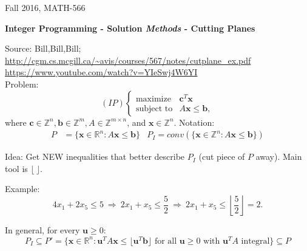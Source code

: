 \documentclass[11pt]{article}
\begin{document}
Fall  2016, MATH-566

\centerline{{\Large \textbf{Integer Programming - Solution \emph{Methods} - Cutting Planes}}}

Source: Bill,Bill,Bill; \\
\url{http://cgm.cs.mcgill.ca/~avis/courses/567/notes/cutplane_ex.pdf} \\
\url{https://www.youtube.com/watch?v=YIeSwj4W6YI}\\

Problem:
\[
(IP)
\begin{cases}
\text{maximize} & \mathbf{c}^T\mathbf{x} \\
\text{subject to} & A\mathbf{x} \leq \mathbf{b},
\end{cases}
\]
where $\mathbf{c} \in \mathbb{Z}^n, \mathbf{b} \in \mathbb{Z}^m, A \in \mathbb{Z}^{m \times n}$, and $\mathbf{x} \in \mathbb{Z}^n$.
Notation:
\begin{align*}
P &= \{ \mathbf{x}\in\mathbb{R}^n: A\mathbf{x} \leq \mathbf{b}  \}   &  
P_I = conv(\{\mathbf{x} \in \mathbb{Z}^n: A\mathbf{x} \leq \mathbf{b} \})
\end{align*}

Idea: Get NEW inequalities that better describe $P_I$ (cut piece of $P$ away). Main tool is $\lfloor\ \rfloor$.

Example:
\[
4x_1 + 2x_5 \leq 5 \ \Rightarrow\  2x_1 + x_5 \leq \frac{5}{2}\ \Rightarrow\  2x_1 + x_5 \leq \left\lfloor\frac{5}{2}\right\rfloor = 2.
\]



In general, for every $\mathbf{u} \geq 0$:
\[
P_I \subseteq P' =  \{ \mathbf{x}\in\mathbb{R}^n:  \mathbf{u}^TA\mathbf{x} \leq \lfloor\mathbf{u}^T\mathbf{b}\rfloor \text{ for all } \mathbf{u} \geq 0 \text{ with } \mathbf{u}^TA  \text{ integral} \}   \subseteq P
\]
\end{document}
